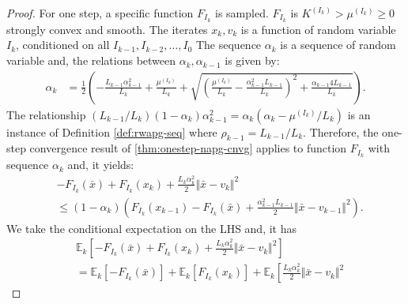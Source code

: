 \documentclass[12pt]{article}
\begin{document}
        \begin{proof}
            For one step, a specific function $F_{I_k}$ is sampled. 
            $F_{I_k}$ is $K^{(I_k)} > \mu^{(I_k)} \ge 0$ strongly convex and smooth. 
            The iterates $x_k, v_k$ is a function of random variable $I_k$, conditioned on all $I_{k - 1}, I_{k - 2}, \ldots , I_0$
            The sequence $\alpha_k$ is a sequence of random variable and, the relations between $\alpha_k, \alpha_{k - 1}$ is given by: 
            \begin{align*}
                \alpha_k &= 
                \frac{1}{2}\left(
                    -\frac{L_{k - 1}\alpha_{k - 1}^2}{L_k} + \frac{\mu^{(I_k)}}{L_k} 
                    + \sqrt{
                        \left(
                            \frac{\mu^{(I_k)}}{L_k}
                            - \frac{\alpha_{k - 1}^2L_{k - 1}}{L_k}
                        \right)^2
                        + \frac{\alpha_{k - 1}4L_{k - 1}}{L_k}
                    }
                \right). 
            \end{align*}
            The relationship $(L_{k - 1}/L_k)(1 - \alpha_k)\alpha_{k - 1}^2 = \alpha_k(\alpha_k - \mu^{(I_k)}/L_k)$ is an instance of Definition \ref{def:rwapg-seq} where $\rho_{k - 1} = L_{k - 1}/L_k$. 
            Therefore, the one-step convergence result of \ref{thm:onestep-napg-cnvg} applies to function $F_{I_k}$ with sequence $\alpha_k$ and, it yields: 
            \begin{align*}
                & - F_{I_k}(\bar x) + F_{I_k}(x_k) + \frac{L_k\alpha_k^2}{2}\Vert \bar x - v_k\Vert^2 
                \\
                & \le 
                (1 - \alpha_k)\left(
                    F_{I_k}(x_{k - 1}) - F_{I_k}(\bar x) 
                    + \frac{\alpha_{k - 1}^2L_{k - 1}}{2}\Vert \bar x - v_{k - 1}\Vert^2
                \right). 
            \end{align*}
            We take the conditional expectation on the LHS and, it has 
            \begin{align*}
                & \mathbb E_k 
                \left[
                    - F_{I_k}(\bar x) + F_{I_k}(x_k) + \frac{L_k\alpha_k^2}{2}\Vert \bar x - v_k\Vert^2
                \right]
                \\
                &= 
                \mathbb E_k \left[- F_{I_k}(\bar x)\right]
                + 
                \mathbb E_k \left[F_{I_k}(x_k)\right]
                + 
                \mathbb E_k \left[
                    \frac{L_k\alpha_k^2}{2}\Vert \bar x - v_k\Vert^2

\end{align*}
\end{proof}
\end{document}
